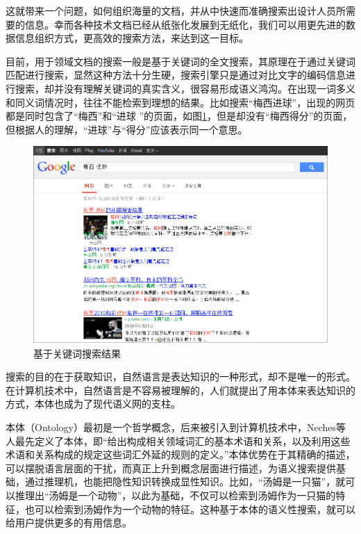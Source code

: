 \documentclass[12pt,a4paper]{article}
\begin{document}
	这就带来一个问题，如何组织海量的文档，并从中快速而准确搜索出设计人员所需要的信息。幸而各种技术文档已经从纸张化发展到无纸化，我们可以用更先进的数据信息组织方式，更高效的搜索方法，来达到这一目标。
   
	目前，用于领域文档的搜索一般是基于关键词的全文搜索，其原理在于通过关键词匹配进行搜索，显然这种方法十分生硬，搜索引擎只是通过对比文字的编码信息进行搜索，却并没有理解关键词的真实含义，很容易形成语义鸿沟。在出现一词多义和同义词情况时，往往不能检索到理想的结果。比如搜索“梅西进球”，出现的网页都是同时包含了“梅西”和“进球 ”的页面，如图{\ref{fig:queryExample}}，但是却没有“梅西得分”的页面，但根据人的理解，“进球”与“得分”应该表示同一个意思。
   
	\begin{figure}[htbp] 
	\centering\includegraphics[width=5in]{queryExample.png} 
	\caption{基于关键词搜索结果}\label{fig:queryExample} 
	\end{figure} 
   
	搜索的目的在于获取知识，自然语言是表达知识的一种形式，却不是唯一的形式。在计算机技术中，自然语言是不容易被理解的，人们就提出了用本体来表达知识的方式，本体也成为了现代语义网的支柱。
   
	本体（Ontology）最初是一个哲学概念，后来被引入到计算机技术中，Neches等人最先定义了本体，即“给出构成相关领域词汇的基本术语和关系，以及利用这些术语和关系构成的规定这些词汇外延的规则的定义。”\cite{3}本体优势在于其精确的描述，可以摆脱语言层面的干扰，而真正上升到概念层面进行描述，为语义搜索提供基础，通过推理机，也能把隐性知识转换成显性知识。比如，“汤姆是一只猫”，就可以推理出“汤姆是一个动物”，以此为基础，不仅可以检索到汤姆作为一只猫的特征，也可以检索到汤姆作为一个动物的特征。这种基于本体的语义性搜索，就可以给用户提供更多的有用信息。
   
\end{document}
